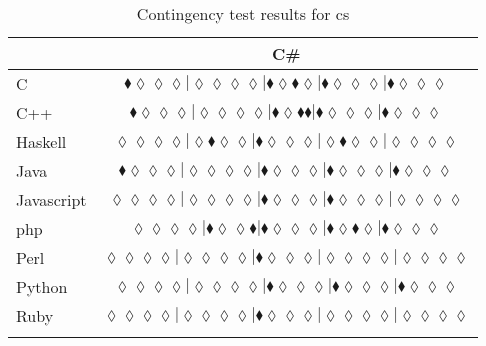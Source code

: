 \begin{table*}
\centering
\begin{tabular}{l c}
& C\# \\
\hline

C & $\scriptscriptstyle\blacklozenge\lozenge\lozenge\lozenge|\lozenge\lozenge\lozenge\lozenge|\blacklozenge\lozenge\blacklozenge\lozenge|\blacklozenge\lozenge\lozenge\lozenge|\blacklozenge\lozenge\lozenge\lozenge$ \\
C++ & $\scriptscriptstyle\blacklozenge\lozenge\lozenge\lozenge|\lozenge\lozenge\lozenge\lozenge|\blacklozenge\lozenge\blacklozenge\blacklozenge|\blacklozenge\lozenge\lozenge\lozenge|\blacklozenge\lozenge\lozenge\lozenge$ \\
Haskell & $\scriptscriptstyle\lozenge\lozenge\lozenge\lozenge|\lozenge\blacklozenge\lozenge\lozenge|\blacklozenge\lozenge\lozenge\lozenge|\lozenge\blacklozenge\lozenge\lozenge|\lozenge\lozenge\lozenge\lozenge$ \\
Java & $\scriptscriptstyle\blacklozenge\lozenge\lozenge\lozenge|\lozenge\lozenge\lozenge\lozenge|\blacklozenge\lozenge\lozenge\lozenge|\blacklozenge\lozenge\lozenge\lozenge|\blacklozenge\lozenge\lozenge\lozenge$ \\
Javascript & $\scriptscriptstyle\lozenge\lozenge\lozenge\lozenge|\lozenge\lozenge\lozenge\lozenge|\blacklozenge\lozenge\lozenge\lozenge|\blacklozenge\lozenge\lozenge\lozenge|\lozenge\lozenge\lozenge\lozenge$ \\
{\sc php} & $\scriptscriptstyle\lozenge\lozenge\lozenge\lozenge|\blacklozenge\lozenge\lozenge\blacklozenge|\blacklozenge\lozenge\lozenge\lozenge|\blacklozenge\lozenge\blacklozenge\lozenge|\blacklozenge\lozenge\lozenge\lozenge$ \\
Perl & $\scriptscriptstyle\lozenge\lozenge\lozenge\lozenge|\lozenge\lozenge\lozenge\lozenge|\blacklozenge\lozenge\lozenge\lozenge|\lozenge\lozenge\lozenge\lozenge|\lozenge\lozenge\lozenge\lozenge$ \\
Python & $\scriptscriptstyle\lozenge\lozenge\lozenge\lozenge|\lozenge\lozenge\lozenge\lozenge|\blacklozenge\lozenge\lozenge\lozenge|\blacklozenge\lozenge\lozenge\lozenge|\blacklozenge\lozenge\lozenge\lozenge$ \\
Ruby & $\scriptscriptstyle\lozenge\lozenge\lozenge\lozenge|\lozenge\lozenge\lozenge\lozenge|\blacklozenge\lozenge\lozenge\lozenge|\lozenge\lozenge\lozenge\lozenge|\lozenge\lozenge\lozenge\lozenge$ \\

\hline
& \\
\end{tabular}
\caption{Contingency test results for cs}
\label{tbl:contingency-test-results-cs}
\end{table*}


